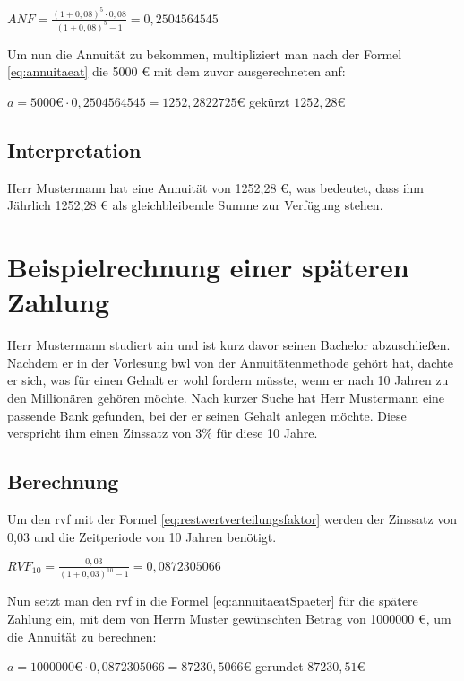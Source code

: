 \bigskip

$ANF = \frac{ (1 + 0,08)^5 \cdot 0,08 }{ (1 + 0,08)^5 - 1 } = 0,2504564545$

\bigskip

\noindent
Um nun die Annuität zu bekommen, multipliziert man nach der Formel \eqref{eq:annuitaeat} die 5000 € mit dem zuvor ausgerechneten \ac{anf}:

\bigskip

$a = 5000 \text{€} \cdot 0,2504564545 = 1252,2822725 \text{€}$ gekürzt $1252,28 \text{€}$

\subsection{Interpretation}

Herr Mustermann hat eine Annuität von 1252,28 €, was bedeutet, dass ihm Jährlich 1252,28 € als gleichbleibende Summe zur Verfügung stehen.


\section{Beispielrechnung einer späteren Zahlung}

Herr Mustermann studiert \ac{ain} und ist kurz davor seinen Bachelor abzuschließen. Nachdem er in der Vorlesung \ac{bwl} von der Annuitätenmethode gehört hat, dachte er sich, was für einen Gehalt er wohl fordern müsste, wenn er nach 10 Jahren zu den Millionären gehören möchte. Nach kurzer Suche hat Herr Mustermann eine passende Bank gefunden, bei der er seinen Gehalt anlegen möchte. Diese verspricht ihm einen Zinssatz von 3\% für diese 10 Jahre.

\subsection{Berechnung}

Um den \ac{rvf} mit der Formel \eqref{eq:restwertverteilungsfaktor} werden der Zinssatz von 0,03 und die Zeitperiode von 10 Jahren benötigt.

\bigskip
$RVF_{10} = \frac{ 0,03 }{ (1 + 0,03)^{10} - 1 } = 0,0872305066$

\bigskip
\noindent
Nun setzt man den \ac{rvf} in die Formel \eqref{eq:annuitaeatSpaeter} für die spätere Zahlung ein, mit dem von Herrn Muster gewünschten Betrag von 1000000 €, um die Annuität zu berechnen:

\bigskip
$a = 1000000 \text{€} \cdot 0,0872305066 = 87230,5066 \text{€}$ gerundet $87230,51 \text{€}$

